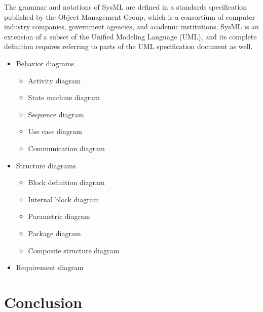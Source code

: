 The grammar and notations of SysML are defined in a standards specification published by the Object Management Group, which is a consortium of computer industry companies, government agencies, and academic institutions. SysML is an extension of a subset of the Unified Modeling Language (UML), and its complete definition requires referring to parts of the UML specification document as well.\cite{LD13}
\begin{itemize}
\item Behavior diagrams\cite{LD13}
\begin{itemize}
\item Activity diagram
\item State machine diagram
\item Sequence diagram
\item Use case diagram
\item Communication diagram
\end{itemize}
\item Structure diagrams\cite{LD13}
\begin{itemize}
\item Block definition diagram
\item Internal block diagram
\item Parametric diagram
\item Package diagram
\item Composite structure diagram
\end{itemize}
\item Requirement diagram\cite{LD13}
\end{itemize}
\vspace{1em}
\section*{Conclusion}











%